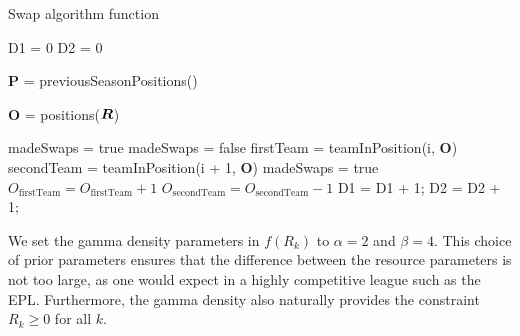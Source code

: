 \begin{algorithm}
\caption{\label{swapAlgo} Swap algorithm function} 
\begin{algorithmic}[1]


\State D1 = 0
\State D2 = 0

\State {}
\State \(\boldsymbol{P}\) = previousSeasonPositions() 

\State {}
\State \(\boldsymbol{O}\) = positions(\(\boldsymbol{R}\))
\State

\State madeSwaps = true
  \State madeSwaps = false
    \State firstTeam = teamInPosition(i, \(\boldsymbol{O}\))
    \State secondTeam = teamInPosition(i + 1, \(\boldsymbol{O}\))
      \State madeSwaps = true
      \State \(O_\text{firstTeam} = O_\text{firstTeam} + 1\)
      \State \(O_\text{secondTeam} = O_\text{secondTeam} - 1\)
	    \State D1 = D1 + 1;
	  \Else
	    \State D2 = D2 + 1;
      \EndIf
    \EndIf
  \EndFor
\EndWhile

\EndFunction
\end{algorithmic}
\end{algorithm}

We set the gamma density parameters in \(f(R_k)\) to \(\alpha = 2\) and \(\beta = 4\). This choice of prior parameters
ensures that the difference between the resource parameters is not too large, as one would expect in a highly
competitive league such as the EPL. Furthermore, the gamma density also naturally provides the constraint \(R_k \geq 0\)
for all \(k\).

